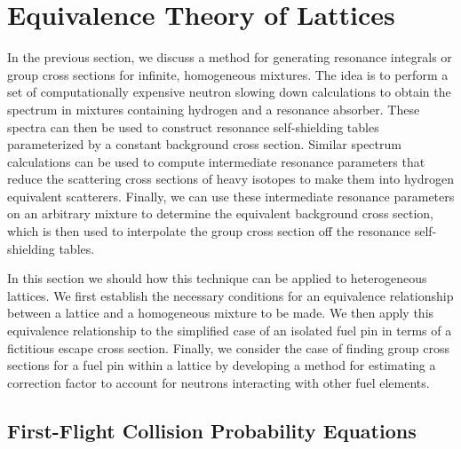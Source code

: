 \section{Equivalence Theory of Lattices}

In the previous section, we discuss a method for generating resonance integrals or group cross sections for infinite, homogeneous mixtures. The idea is to perform a set of computationally expensive neutron slowing down calculations to obtain the spectrum in mixtures containing hydrogen and a resonance absorber. These spectra can then be used to construct resonance self-shielding tables parameterized by a constant background cross section. Similar spectrum calculations can be used to compute intermediate resonance parameters that reduce the scattering cross sections of heavy isotopes to make them into hydrogen equivalent scatterers. Finally, we can use these intermediate resonance parameters on an arbitrary mixture to determine the equivalent background cross section, which is then used to interpolate the group cross section off the resonance self-shielding tables.

In this section we should how this technique can be applied to heterogeneous lattices. We first establish the necessary conditions for an equivalence relationship between a lattice and a homogeneous mixture to be made. We then apply this equivalence relationship to the simplified case of an isolated fuel pin in terms of a fictitious escape cross section. Finally, we consider the case of finding group cross sections for a fuel pin within a lattice by developing a method for estimating a correction factor to account for neutrons interacting with other fuel elements.

\subsection{First-Flight Collision Probability Equations}

